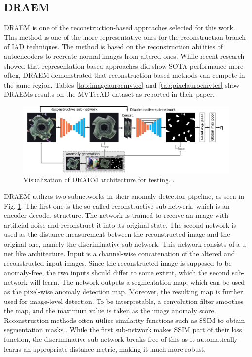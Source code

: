 \subsection{DRAEM}
\label{subsec:DRAEM}

DRAEM \cite{Zavrtanik_2021DRAEM} is one of the reconstruction-based approaches selected for this work. This method is one of the more representative ones for the reconstruction branch of 
IAD techniques. The method is based on the reconstruction abilities of autoencoders to recreate normal images from altered ones. While recent research showed that representation-based approaches did 
show SOTA performance more often, DRAEM demonstrated that reconstruction-based methods can compete in the same region. Tables \ref{tab:imageaurocmvtec} and 
\ref{tab:pixelaurocmvtec} show DRAEMs results on the MVTecAD dataset as reported 
in their paper.\newline

\begin{figure}[H]
 \centering
\includegraphics[width=\textwidth]{figures/DRAEM_pipeline.png}
 \caption{Visualization of DRAEM architecture for testing. \cite{Zavrtanik_2021DRAEM}.}
 \label{fig:draempipeline}
\end{figure}

DRAEM utilizes two subnetworks in their anomaly detection pipeline, as seen in Fig. \ref{fig:draempipeline}. The first one is the so-called reconstructive sub-network, which is an encoder-decoder structure. The network is trained 
to receive an image with artificial noise and reconstruct it into its original state. The second network is used as the distance measurement between the reconstructed image and the original one, 
namely the discriminative sub-network. This network consists of a u-net \cite{Ronneberger_2015UNET} like architecture. Input is a channel-wise concatenation of the altered and reconstructed 
input images. Since the reconstructed image is supposed to be anomaly-free, the two inputs should differ to some extent, which the second sub-network will learn. The network outputs a segmentation map, 
which can be used as the pixel-wise anomaly detection map. Moreover, the resulting map is further used for image-level detection. To be interpretable, a convolution filter smoothes the map, and the maximum value is taken as the image anomaly score. Reconstruction methods often utilize similarity functions such as SSIM \cite{Wang_2004SSIM} to obtain segmentation masks \cite{Zavrtanik_2021DRAEM} 
\cite{liu2024deep}. While the first 
sub-network makes SSIM part of their loss function, the discriminative sub-network breaks free of this as it automatically learns an appropriate distance metric, making it much more robust.

